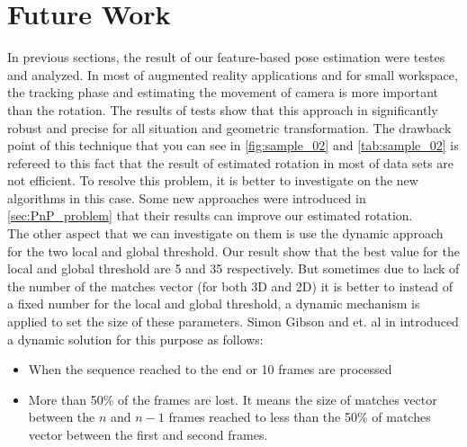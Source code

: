 \section{Future Work}
In previous sections, the result of our feature-based pose estimation were testes and analyzed. In most of augmented reality applications and for small workspace, the tracking phase and estimating the movement of camera is more important than the rotation. The results of tests show that this approach in significantly robust and precise for all situation and geometric transformation. The drawback point of this technique that you can see in \autoref{fig:sample_02} and \autoref{tab:sample_02} is refereed to this fact that the result of estimated rotation in most of data sets are not efficient. To resolve this problem, it is better to investigate on the new algorithms in this case. Some new approaches were introduced in \autoref{sec:PnP_problem} that their results can improve our estimated rotation. \\
The other aspect that we can investigate on them is use the dynamic approach for the two local and global threshold. Our result show that the best value for the local and global threshold are 5 and 35 respectively. But sometimes due to lack of the number of the matches vector (for both 3D and 2D) it is better to instead of a fixed number for the local and global threshold, a dynamic mechanism is applied to set the size of these parameters. Simon Gibson and et. al in \cite{gibson2002accurate} introduced a dynamic solution for this purpose as follows:
\begin{itemize}
\item When the sequence reached to the end or 10 frames are processed
\item More than 50\% of the frames are lost. It means the size of matches vector between the $n$ and $n-1$ frames reached to less than the 50\% of matches vector between the first and second frames.
\end{itemize}